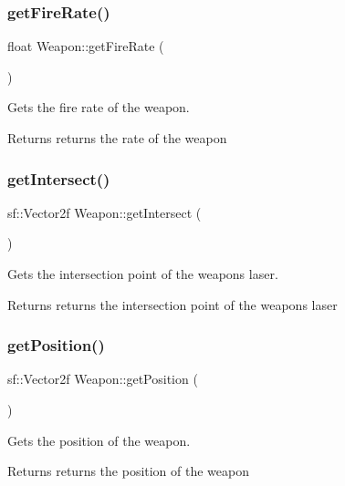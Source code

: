 \subsubsection{\texorpdfstring{get\+Fire\+Rate()}{getFireRate()}}
{\footnotesize\ttfamily float Weapon\+::get\+Fire\+Rate (\begin{DoxyParamCaption}{ }\end{DoxyParamCaption})}



Gets the fire rate of the weapon. 

\begin{DoxyReturn}{Returns}
returns the rate of the weapon 
\end{DoxyReturn}
\mbox{\label{class_weapon_a35a7c4790ffd0f77a4de0baa752c6cac}} 
\subsubsection{\texorpdfstring{get\+Intersect()}{getIntersect()}}
{\footnotesize\ttfamily sf\+::\+Vector2f Weapon\+::get\+Intersect (\begin{DoxyParamCaption}{ }\end{DoxyParamCaption})}



Gets the intersection point of the weapons laser. 

\begin{DoxyReturn}{Returns}
returns the intersection point of the weapons laser 
\end{DoxyReturn}
\mbox{\label{class_weapon_a6457c3af859075380b04e7a1a07f1359}} 
\subsubsection{\texorpdfstring{get\+Position()}{getPosition()}}
{\footnotesize\ttfamily sf\+::\+Vector2f Weapon\+::get\+Position (\begin{DoxyParamCaption}{ }\end{DoxyParamCaption})}



Gets the position of the weapon. 

\begin{DoxyReturn}{Returns}
returns the position of the weapon 
\end{DoxyReturn}
\mbox{\label{class_weapon_aab3dab9bb65fc9797e3d30dcd848b4a8}} 
